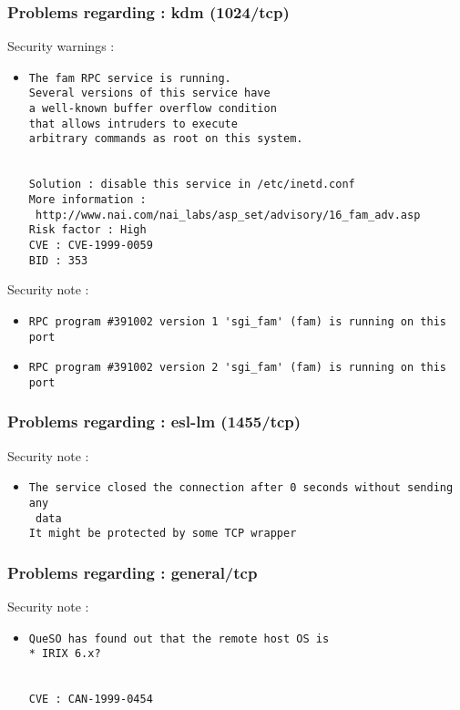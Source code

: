 \documentclass{article}
\begin{document}
\subsubsection{Problems regarding : kdm (1024/tcp)}
Security warnings :\\
\begin{itemize}
\item \begin{verbatim}
The fam RPC service is running. 
Several versions of this service have
a well-known buffer overflow condition
that allows intruders to execute
arbitrary commands as root on this system.


Solution : disable this service in /etc/inetd.conf
More information :
 http://www.nai.com/nai_labs/asp_set/advisory/16_fam_adv.asp
Risk factor : High
CVE : CVE-1999-0059
BID : 353
\end{verbatim}\end{itemize}
Security note :\\
\begin{itemize}
\item \begin{verbatim}
RPC program #391002 version 1 'sgi_fam' (fam) is running on this port
\end{verbatim}\item \begin{verbatim}
RPC program #391002 version 2 'sgi_fam' (fam) is running on this port
\end{verbatim}\end{itemize}
\subsubsection{Problems regarding : esl-lm (1455/tcp)}
Security note :\\
\begin{itemize}
\item \begin{verbatim}
The service closed the connection after 0 seconds without sending any
 data
It might be protected by some TCP wrapper

\end{verbatim}\end{itemize}
\subsubsection{Problems regarding : general/tcp}
Security note :\\
\begin{itemize}
\item \begin{verbatim}
QueSO has found out that the remote host OS is 
* IRIX 6.x?  


CVE : CAN-1999-0454
\end{verbatim}\end{itemize}
\end{document}
